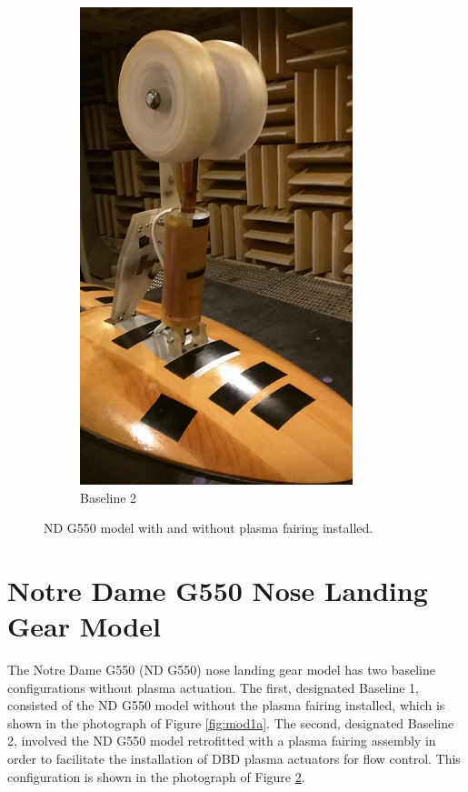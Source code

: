 \begin{figure}
\begin{center}
\begin{subfigure}{0.45\textwidth}
\includegraphics[width=\linewidth]{figures/model1b}
\caption{Baseline 2}
\label{fig:mod1b}
\end{subfigure}
\caption{ND G550 model with and without plasma fairing installed.}
\end{center}
\end{figure}

\section{Notre Dame G550 Nose Landing Gear Model}
The Notre Dame G550 (ND G550) nose landing gear model has two baseline configurations without plasma actuation. The first, designated Baseline 1, consisted of the ND G550 model without the plasma fairing installed, which is shown in the photograph of Figure \ref{fig:mod1a}. The second, designated Baseline 2, involved the ND G550 model retrofitted with a plasma fairing assembly in order to facilitate the installation of DBD plasma actuators for flow control. This configuration is shown in the photograph of Figure \ref{fig:mod1b}.

